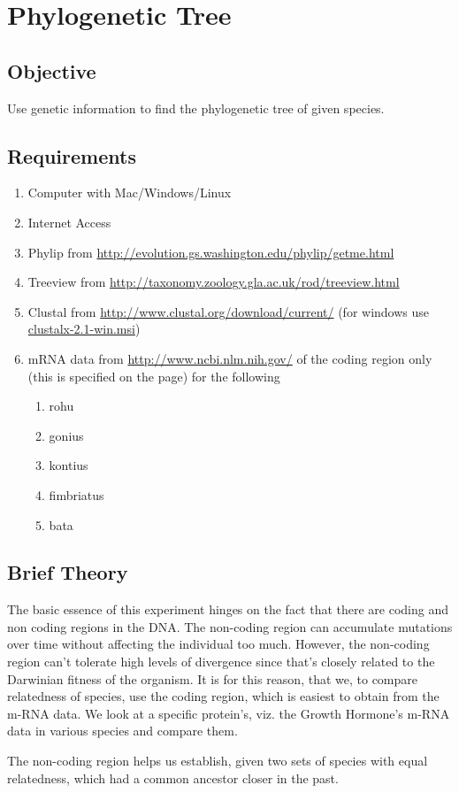 \chapter{Phylogenetic Tree}
\section{Objective}
Use genetic information to find the phylogenetic tree of given species.

\section{Requirements}
	\begin{enumerate}
		\item Computer with Mac/Windows/Linux
		\item Internet Access
		\item Phylip from \url{http://evolution.gs.washington.edu/phylip/getme.html}
		\item Treeview from \url{http://taxonomy.zoology.gla.ac.uk/rod/treeview.html}
		\item Clustal from \url{http://www.clustal.org/download/current/} (for windows use \url{clustalx-2.1-win.msi})
		\item mRNA data from \url{http://www.ncbi.nlm.nih.gov/} of the coding region only (this is specified on the page) for the following \label{tree_source}
		\begin{enumerate}
			\item rohu
			\item gonius
			\item kontius
			\item fimbriatus
			\item bata
		\end{enumerate}
	\end{enumerate}

\section{Brief Theory}
	The basic essence of this experiment hinges on the fact that there are coding and non coding regions in the DNA. The non-coding region can accumulate mutations over time without affecting the individual too much. However, the non-coding region can't tolerate high levels of divergence since that's closely related to the Darwinian fitness of the organism. It is for this reason, that we, to compare relatedness of species, use the coding region, which is easiest to obtain from the m-RNA data. We look at a specific protein's, viz. the Growth Hormone's m-RNA data in various species and compare them. 
	\par
	The non-coding region helps us establish, given two sets of species with equal relatedness, which had a common ancestor closer in the past.

